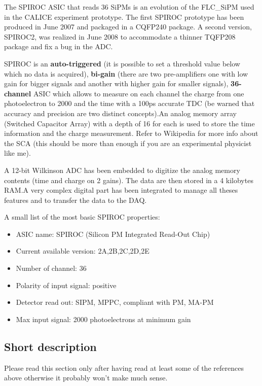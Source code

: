 The SPIROC ASIC that reads 36 SiPMs is an evolution of the FLC\_SiPM used in the
CALICE experiment prototype. The first SPIROC prototype has been produced in
June 2007 and packaged in a CQFP240 package. A second version, SPIROC2, was
realized in June 2008 to accommodate a thinner TQFP208 package and fix a bug in
the ADC.

SPIROC is an \textbf{auto-triggered} (it is possible to set a threshold value
below which no data is acquired), \textbf{bi-gain} (there are two pre-amplifiers
one with low gain for bigger signals and another with higher gain for smaller
signals), \textbf{36-channel} ASIC which allows to measure on each channel the
charge from one photoelectron to 2000 and the time with a 100ps accurate TDC (be
warned that accuracy and precision are two distinct concepts).\@ An analog
memory array (Switched Capacitor Array) with a depth of 16 for each is used to
store the time information and the charge measurement. Refer to Wikipedia for
more info about the SCA (this should be more than enough if you are an
experimental physicist like me).

A 12-bit Wilkinson ADC has been embedded to digitize the analog memory contents
(time and charge on 2 gains). The data are then stored in a 4 kilobytes RAM.\@ A
very complex digital part has been integrated to manage all theses features and
to transfer the data to the DAQ.\@

A small list of the most basic SPIROC properties:
\begin{itemize}
\item ASIC name: SPIROC (Silicon PM Integrated Read-Out Chip)
\item Current available version: 2A,2B,2C,2D,2E
\item Number of channel: 36
\item Polarity of input signal: positive
\item Detector read out: SIPM, MPPC, compliant with PM, MA-PM
\item Max input signal: 2000 photoelectrons at minimum gain
\end{itemize}

\subsection{Short description}
Please read this section only after having read at least some of the references
above otherwise it probably won't make much sense.

